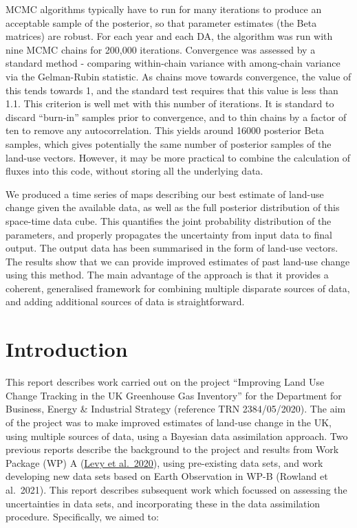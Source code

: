 \documentclass[
]{book}
\begin{document}
MCMC algorithms typically have to run for many iterations to produce an acceptable sample of the posterior, so that parameter estimates (the Beta matrices) are robust. For each year and each DA, the algorithm was run with nine MCMC chains for 200,000 iterations. Convergence was assessed by a standard method - comparing within-chain variance with among-chain variance via the Gelman-Rubin statistic. As chains move towards convergence, the value of this tends towards 1, and the standard test requires that this value is less than 1.1. This criterion is well met with this number of iterations. It is standard to discard ``burn-in'' samples prior to convergence, and to thin chains by a factor of ten to remove any autocorrelation. This yields around 16000 posterior Beta samples, which gives potentially the same number of posterior samples of the land-use vectors. However, it may be more practical to combine the calculation of fluxes into this code, without storing all the underlying data.

We produced a time series of maps describing our best estimate of land-use change given the available data, as well as the full posterior distribution of this space-time data cube. This quantifies the joint probability distribution of the parameters, and properly propagates the uncertainty from input data to final output. The output data has been summarised in the form of land-use vectors. The results show that we can provide improved estimates of past land-use change using this method. The main advantage of the approach is that it provides a coherent, generalised framework for combining multiple disparate sources of data, and adding additional sources of data is straightforward.

\hypertarget{introduction}{%
\chapter{Introduction}\label{introduction}}

This report describes work carried out on the project
``Improving Land Use Change Tracking in the UK Greenhouse Gas Inventory'' for the Department for Business, Energy \& Industrial Strategy (reference TRN 2384/05/2020). The aim of the project was to make improved estimates of land-use change in the UK, using multiple sources of data, using a Bayesian data assimilation approach. Two previous reports describe the background to the project and results from Work Package (WP) A (\href{https://nerc-ceh.github.io/luc_track/}{Levy et al.~2020}), using pre-existing data sets, and work developing new data sets based on Earth Observation in WP-B (Rowland et al.~2021).
This report describes subsequent work which focussed on assessing the uncertainties in data sets, and incorporating these in the data assimilation procedure.
Specifically, we aimed to:
\end{document}
